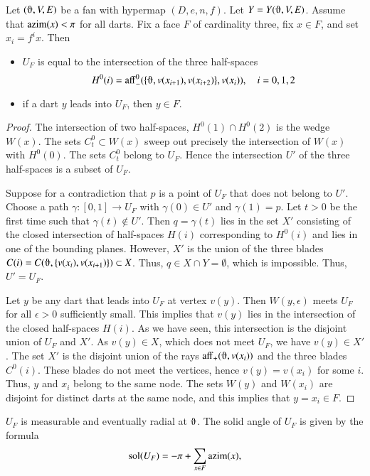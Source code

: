 \begin{lemma} \label{lemma:triangle}
Let $(\orgn,V,E)$ be a fan with hypermap $(D,e,n,f)$. 
Let $Y=Y(\orgn,V,E)$.
Assume that ${\operatorname{azim}}(x)<\pi$
for all darts.  Fix a face $F$ of cardinality three, fix
$x\in F$, and set $x_i = f^i x$. Then
\begin{itemize}  
\item $U_F$ is equal to the intersection of the three half-spaces
$$H^0(i)=\op{aff}_-^0(\{\orgn,v(x_{i+1}),v(x_{i+2})\},v(x_i)),\quad i=0,1,2$$
\item if a dart $y$ leads into $U_F$, then $y\in F$.
\end{itemize}
\end{lemma}

\begin{proof} The intersection of two half-spaces, $H^0(1)\cap H^0(2)$ is
the wedge $W(x)$.   The sets $C^0_t\subset W(x)$ sweep out precisely
the intersection of $W(x)$ with $H^0(0)$.  The sets $C^0_t$ belong to
$U_F$.  Hence the intersection $U'$ of the three half-spaces is a subset of $U_F$.

Suppose for a contradiction 
that $p$ is a point of $U_F$ that does not belong to $U'$.  Choose a path $\gamma:[0,1]\to U_F$ with $\gamma(0)\in U'$ and $\gamma(1)=p$.  Let $t>0$ be the first time such that $\gamma(t)\not\in U'$.  Then $q=\gamma(t)$ lies
in the set $X'$ consisting of the closed intersection of half-spaces $H(i)$
corresponding to $H^0(i)$ and lies
in one of the bounding planes.  However, $X'$ is the union of the three
blades $C(i)=C(\orgn,\{v(x_i),v(x_{i+1})\})\subset X$.  Thus,
$q\in X\cap Y = \emptyset$, which is impossible.  Thus, $U'=U_F$.

Let $y$ be any dart that leads into $U_F$ at vertex $v(y)$.  Then
$W(y,\epsilon)$ meets $U_F$ for all $\epsilon>0$ sufficiently small.
This implies that $v(y)$ lies in the intersection of the closed half-spaces $H(i)$.  As we have seen, this intersection is the disjoint union of $U_F$ and
$X'$.  As $v(y)\in X$, which does not meet $U_F$, we have $v(y)\in X'$.
The set $X'$ is the disjoint union of the rays $\op{aff}_+(\orgn,v(x_i))$ and
the three blades $C^0(i)$.  These blades do not meet the vertices, hence
$v(y)=v(x_i)$ for some $i$.  Thus, $y$ and $x_i$ belong to the same
node.  The sets $W(y)$ and $W( x_i)$ are disjoint for distinct darts at the same
node, and this implies that $y=x_i\in F$.
\end{proof}

\begin{corollary}\label{lemma:girard-component}
$U_F$ is measurable and eventually radial at $\orgn$.
The solid angle of $U_F$ is given by the formula
$$
\operatorname{sol}(U_F) = -\pi + \sum_{x\in F}{\operatorname{azim}}(x),
$$
\end{corollary}

